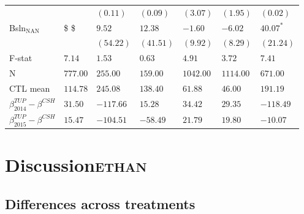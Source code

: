 \documentclass[11pt]{article}
\begin{document}
\begin{center}
\begin{tabular}{lllllll}
 &  & \(( 0.11)\) & \(( 0.09)\) & \(( 3.07)\) & \(( 1.95)\) & \(( 0.02)\)\\
Bsln\(_{\text{NAN}}\) & \$ \$ & \(9.52\) & \(12.38\) & \(-1.60\) & \(-6.02\) & \(40.07^{*}\)\\
 &  & \((54.22)\) & \((41.51)\) & \(( 9.92)\) & \(( 8.29)\) & \((21.24)\)\\
F-stat & \(7.14\) & \(1.53\) & \(0.63\) & \(4.91\) & \(3.72\) & \(7.41\)\\
\hline
N & \(777.00\) & \(255.00\) & \(159.00\) & \(1042.00\) & \(1114.00\) & \(671.00\)\\
CTL mean & \(114.78\) & \(245.08\) & \(138.40\) & \(61.88\) & \(46.00\) & \(191.19\)\\
\hline
\(\beta^{TUP}_{2014}-\beta^{CSH}\) & \(31.50\) & \(-117.66\) & \(15.28\) & \(34.42\) & \(29.35\) & \(-118.49\)\\
\(\beta^{TUP}_{2015}-\beta^{CSH}\) & \(15.47\) & \(-104.51\) & \(-58.49\) & \(21.79\) & \(19.80\) & \(-10.07\)\\
\hline
\end{tabular}
\end{center}




\section{Discussion\hfill{}\textsc{ethan}}
\label{sec:orgheadline29}
\subsection{Differences across treatments}
\label{sec:orgheadline27}
\subsection{}
\label{sec:orgheadline28}
\end{document}
